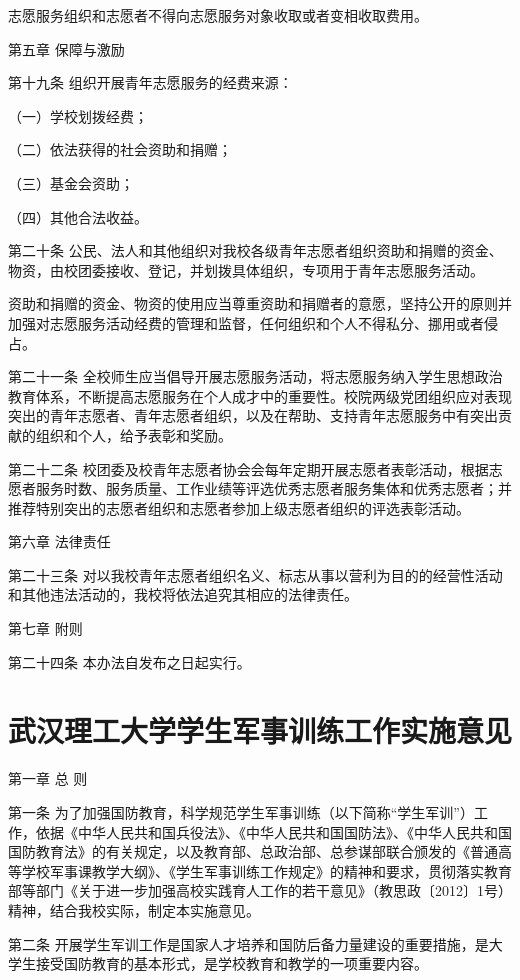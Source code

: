 \documentclass[UTF8,12pt,a4paper]{report}
\begin{document}
志愿服务组织和志愿者不得向志愿服务对象收取或者变相收取费用。

 

第五章  保障与激励

第十九条 组织开展青年志愿服务的经费来源：

（一）学校划拨经费；

（二）依法获得的社会资助和捐赠；

（三）基金会资助；

（四）其他合法收益。

第二十条 公民、法人和其他组织对我校各级青年志愿者组织资助和捐赠的资金、物资，由校团委接收、登记，并划拨具体组织，专项用于青年志愿服务活动。

资助和捐赠的资金、物资的使用应当尊重资助和捐赠者的意愿，坚持公开的原则并加强对志愿服务活动经费的管理和监督，任何组织和个人不得私分、挪用或者侵占。

第二十一条 全校师生应当倡导开展志愿服务活动，将志愿服务纳入学生思想政治教育体系，不断提高志愿服务在个人成才中的重要性。校院两级党团组织应对表现突出的青年志愿者、青年志愿者组织，以及在帮助、支持青年志愿服务中有突出贡献的组织和个人，给予表彰和奖励。

第二十二条 校团委及校青年志愿者协会会每年定期开展志愿者表彰活动，根据志愿者服务时数、服务质量、工作业绩等评选优秀志愿者服务集体和优秀志愿者；并推荐特别突出的志愿者组织和志愿者参加上级志愿者组织的评选表彰活动。

 

第六章  法律责任

第二十三条 对以我校青年志愿者组织名义、标志从事以营利为目的的经营性活动和其他违法活动的，我校将依法追究其相应的法律责任。

 

第七章  附则

第二十四条 本办法自发布之日起实行。
\chapter{武汉理工大学学生军事训练工作实施意见}
第一章 总 则

第一条 为了加强国防教育，科学规范学生军事训练（以下简称“学生军训”）工作，依据《中华人民共和国兵役法》、《中华人民共和国国防法》、《中华人民共和国国防教育法》的有关规定，以及教育部、总政治部、总参谋部联合颁发的《普通高等学校军事课教学大纲》、《学生军事训练工作规定》的精神和要求，贯彻落实教育部等部门《关于进一步加强高校实践育人工作的若干意见》（教思政〔2012〕1号）精神，结合我校实际，制定本实施意见。

第二条 开展学生军训工作是国家人才培养和国防后备力量建设的重要措施，是大学生接受国防教育的基本形式，是学校教育和教学的一项重要内容。
\end{document}

